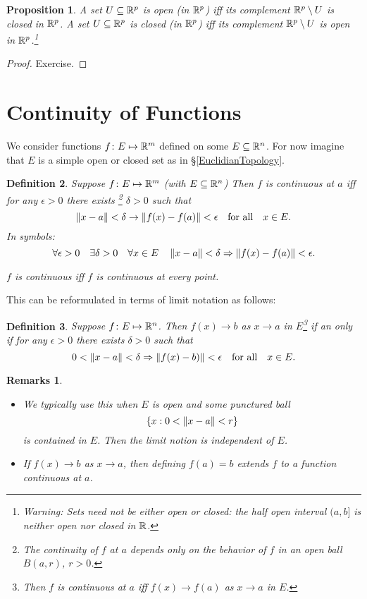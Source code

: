 \documentclass{notes}
\theoremstyle{plain}
\newtheorem{proposition}{Proposition}[chapter]
\newtheorem{definition}[proposition]{Definition}
\newtheorem*{remarks}{Remarks}
\newcommand{\Forall}[1]{\forall #1 \quad}
\newcommand{\Exists}[1]{\exists #1 \quad}
\begin{document}
\begin{proposition}
A set $ U \subseteq \mathbb{R}^{p} $ is open (in $ \mathbb{R}^{p} $) iff its 
complement $ \mathbb{R}^{p} \setminus U $ is closed in $ \mathbb{R}^{p} $.
A set $ U \subseteq \mathbb{R}^{p} $ is closed (in $ \mathbb{R}^{p} $) iff its 
complement $ \mathbb{R}^{p} \setminus U $ is open in $ \mathbb{R}^{p} $.\footnote{Warning:
 Sets need not be either open or closed: the half open 
interval $ (a,b] $ is neither open nor closed in $ \mathbb{R} $.}
\end{proposition}

\begin{proof}
Exercise.
\end{proof}

\section{Continuity of Functions}

We consider functions $ f\colon E \mapsto \mathbb{R}^{m} $ defined on some $ 
E \subseteq \mathbb{R}^{n} $. For now imagine that $ E $ is a simple open 
or closed set as in \S \ref{EuclidianTopology}.

\begin{definition}
Suppose $ f\colon E \mapsto \mathbb{R}^{m} $ (with $ E \subseteq \mathbb{R}^{n} $) 
Then $ f $ is \emph{continuous at $ a $} iff for any 
$ \epsilon >0 $ there exists
\footnote{The continuity of $ f $ at $ a $ depends only on 
the behavior of $ f $ in an open ball $ B(a,r) $, $ r>0 $.}
$ \delta >0  $ such that
\[ \left\|x-a\right\| < \delta \to \left\|f(x)-f(a)\right\|<\epsilon \quad 
\text{for all} \quad x \in E. \]
In symbols:
\[ \Forall{\epsilon>0}\Exists{\delta >0} \Forall{x \in E} 
\norm{x-a}<\delta \Rightarrow \norm{f(x)-f(a)}< \epsilon. \]

$ f $ is \emph{continuous} iff $ f $ is continuous at every point.
\end{definition}

This can be reformulated in terms of limit notation as follows:

\begin{definition}
Suppose $ f \colon E \mapsto \mathbb{R}^{n} $. Then $ f(x) \to b $ 
as $ x \to a $ in $ E $\footnote{Then $ f $ is continuous at $ a $ iff $ f(x) \to 
f(a) $ as $ x \to a $ in $ E $.} if an only if for any $ \epsilon>0 
$ there exists $ \delta>0 $ such that
\[
0 < \left\|x-a\right\| < \delta \Rightarrow \left\|f(x)-b)\right\|<\epsilon \quad 
\text{for all} \quad x \in E.
\]
\end{definition}


\begin{remarks}
\

\begin{itemize}
\item We typically use this when $ E $ is open and some punctured 
ball \[ \{ x : 0 < \left\|x-a\right\|<r \} \] is contained in $ E $. Then 
the limit notion is independent of $ E $.

\item If $ f(x) \to b $ as $ x \to a $, then 
defining $ f(a)=b $ extends $ f $ to a function continuous at $ a $.
\end{itemize}
\end{remarks}
\end{document}
